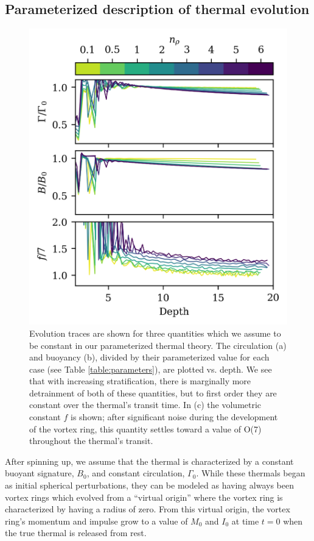 \documentclass[twocolumn, amsmath, amsfonts, amssymb, trackchanges]{aastex62}
\begin{document}
\subsection{Parameterized description of thermal evolution}
\begin{figure}[t!]
    \includegraphics[width=\columnwidth]{constants.png}
    \caption{
	Evolution traces are shown for  three quantities which we assume to be constant in our parameterized thermal theory. 
	The circulation (a) and buoyancy (b), divided by their parameterized value for each case (see Table \ref{table:parameters}), are plotted vs. depth. 
	We see that with increasing stratification, there is marginally more detrainment of both of these quantities, but to first order they are constant over the	thermal's transit time. 
	In (c) the volumetric constant $f$ is shown; after significant noise during the development of the vortex ring, this quantity settles toward a value of O(7) throughout the thermal's transit.
    \label{fig:constants} }
\end{figure}

After spinning up, we assume that the thermal is characterized by a constant buoyant signature, $B_0$, and constant circulation, $\Gamma_0$.
While these thermals began as initial spherical perturbations, they can be modeled as having always been vortex rings which evolved from a ``virtual origin'' where the vortex ring is characterized by having a radius of zero. 
From this virtual origin, the vortex ring's momentum and impulse grow to a value of $M_0$ and $I_0$ at time $t = 0$ when the true thermal is released from rest.
\end{document}

